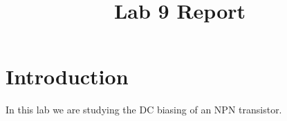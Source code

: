 \documentclass{article}
\title{Lab 9 Report}
\begin{document}
\maketitle
\section{Introduction}
In this lab we are studying the DC biasing of an NPN
transistor.
\end{document}
